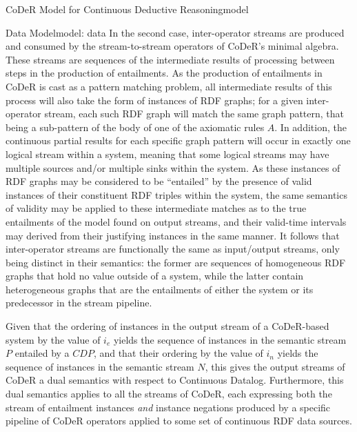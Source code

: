 \begin{nestedsection}{CoDeR Model for Continuous Deductive Reasoning}{model}
\begin{nestedsection}{Data Model}{model: data}
		In the second case, inter-operator streams are produced and consumed by the stream-to-stream operators of CoDeR's minimal algebra.
		These streams are sequences of the intermediate results of processing between steps in the production of entailments.
		As the production of entailments in CoDeR is cast as a pattern matching problem, all intermediate results of this process will also take the form of instances of RDF graphs;
		for a given inter-operator stream, each such RDF graph will match the same graph pattern, that being a sub-pattern of the body of one of the axiomatic rules $A$.
		In addition, the continuous partial results for each specific graph pattern will occur in exactly one logical stream within a system, meaning that some logical streams may have multiple sources and/or multiple sinks within the system.
		As these instances of RDF graphs may be considered to be ``entailed'' by the presence of valid instances of their constituent RDF triples within the system, the same semantics of validity may be applied to these intermediate matches as to the true entailments of the model found on output streams, and their valid-time intervals may derived from their justifying instances in the same manner.
		It follows that inter-operator streams are functionally the same as input/output streams, only being distinct in their semantics:
		the former are sequences of homogeneous RDF graphs that hold no value outside of a system, while the latter contain heterogeneous graphs that are the entailments of either the system or its predecessor in the stream pipeline.

		Given that the ordering of instances in the output stream of a CoDeR-based system by the value of $i_{e}$ yields the sequence of instances in the semantic stream $P$ entailed by a ${CDP}$, and that their ordering by the value of $i_{n}$ yields the sequence of instances in the semantic stream $N$, this gives the output streams of CoDeR a dual semantics with respect to Continuous Datalog.
		Furthermore, this dual semantics applies to all the streams of CoDeR, each expressing both the stream of entailment instances \emph{and} instance negations produced by a specific pipeline of CoDeR operators applied to some set of continuous RDF data sources.
	\end{nestedsection}



\end{nestedsection}